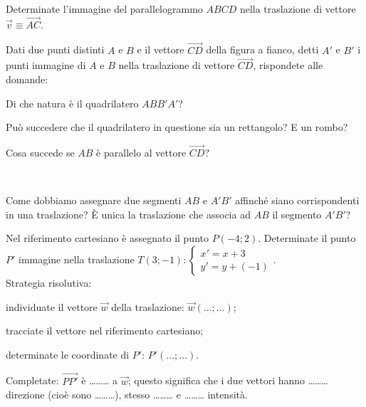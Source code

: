 \begin{esercizio}
\label{ese:8.45} %
Determinate l'immagine del parallelogrammo $ABCD$ nella traslazione 
di vettore $\vec{v} \equiv \overrightarrow{AC}$.
\end{esercizio}

\noindent\begin{minipage}{0.75\textwidth}\parindent15pt
\begin{esercizio}
\label{ese:8.46} %
Dati due punti distinti $A$ e $B$ e il vettore $\overrightarrow{CD}$ 
della figura a fianco, detti $A'$ e $B'$ i punti immagine di $A$ e 
$B$ nella traslazione di vettore $\overrightarrow{CD}$, rispondete 
alle domande:
\begin{enumeratea}
\item Di che natura è il quadrilatero $ABB'A'$?
\item Può succedere che il quadrilatero in questione sia un 
rettangolo? E un rombo?
\item Cosa succede se $AB$ è parallelo al vettore 
$\overrightarrow{CD}$?
\end{enumeratea}
\end{esercizio}
\end{minipage}\hfil
\begin{minipage}{0.25\textwidth}
	\centering~~
\end{minipage}\vspace{8pt}

\begin{esercizio}
\label{ese:8.47} %
Come dobbiamo assegnare due segmenti $AB$ e $A'B'$ affinché siano 
corrispondenti in una traslazione? \`E unica la traslazione che 
associa ad $AB$ il segmento $A'B'$?
\end{esercizio}

\begin{esercizio}
\label{ese:8.48} %
Nel riferimento cartesiano è assegnato il punto $P(-4;2)$. 
Determinate il punto $P'$ immagine nella traslazione 
$T(3;-1):\begin{cases}x'=x+3\\y'=y+(-1)\end{cases}$.\\
Strategia risolutiva:
\begin{enumerate*}
\item individuate il vettore $\vec{w}$ della traslazione: 
$\vec{w}(\ldots{};\ldots{})$;
\item tracciate il vettore nel riferimento cartesiano;
\item determinate le coordinate di $P'$: $P'(\ldots{};\ldots{})$.
\end{enumerate*}
Completate: $\overrightarrow{PP'}$ è \ldots\ldots\ldots{} a 
$\vec{w}$; questo significa che i due vettori hanno 
\ldots\ldots\ldots{} direzione (cioè sono \ldots\ldots\ldots{}), 
stesso \ldots\ldots\ldots{} e \ldots\ldots\ldots{} intensità.
\end{esercizio}

